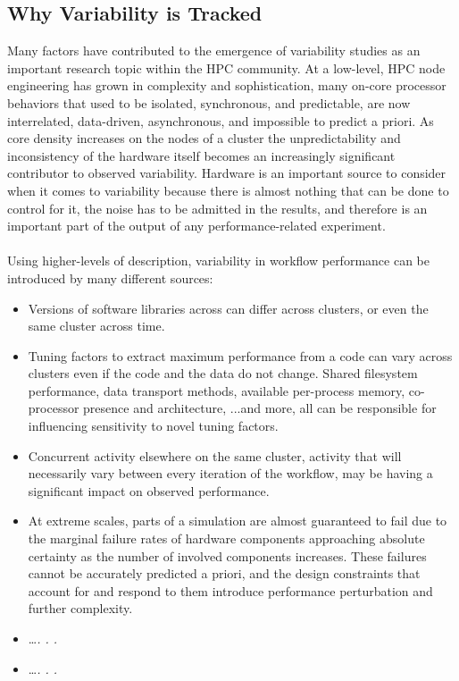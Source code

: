 \subsection{Why Variability is Tracked}
Many factors have contributed to the emergence of variability studies as an 
important research topic within the HPC community. At a low-level, HPC node 
engineering has grown in complexity and sophistication, many on-core processor 
behaviors that used to be isolated, synchronous, and predictable, are now 
interrelated, data-driven, asynchronous, and impossible to predict a priori. As 
core density increases on the nodes of a cluster  the unpredictability and inconsistency 
of the hardware itself becomes an increasingly significant contributor to 
observed variability. Hardware is an important source to consider when it comes 
to variability because there is almost nothing that can be done to control for 
it, the noise has to be admitted in the results, and therefore is an important 
part of the output of any performance-related experiment.\\
\\
Using higher-levels of  description, variability in workflow 
performance can be introduced by many different sources:
\begin{itemize}
    \item Versions of software libraries across can differ across clusters, or 
    even the same cluster across time.
    \item Tuning factors to extract maximum 
    performance from a code can vary across clusters even if the code and the 
    data do not change. Shared filesystem performance, data transport methods, 
    available per-process memory, 
    co-processor presence and architecture, ...and more, all can be responsible 
    for influencing sensitivity to novel tuning factors.
    \item Concurrent activity elsewhere on the same cluster, activity that will 
    necessarily vary between every iteration of the workflow, may be having a 
    significant impact on observed performance.
    \item At extreme scales, parts of a simulation are almost guaranteed to 
    fail due to the marginal failure rates of hardware components approaching 
    absolute certainty as the number of involved components increases. These 
    failures cannot 
    be accurately predicted a priori, and the design constraints that account 
    for and respond to them introduce performance perturbation and further 
    complexity.
    \item \ldots \textit{. . .}
    \item \ldots \textit{. . .}
\end{itemize}
